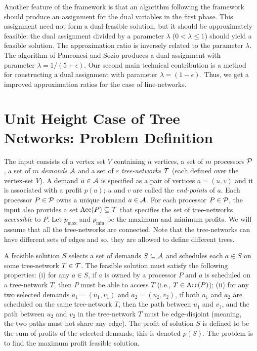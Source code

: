 \documentclass[11pt]{article}
\newcommand{\calP} {{\cal P}}
\newcommand{\calA} {{\cal A}}
\newcommand{\calT} {{\cal T}}
\newcommand{\Acc} {{\rm Acc}}
\begin{document}
Another feature of the framework is that an algorithm following the framework should
produce an assignment for the dual variables in the first phase.
This assignment need not form a dual feasible solution, but it should be approximately feasible:
the dual assignment divided by a parameter $\lambda$ ($0< \lambda \leq 1$) should yield a
feasible solution. The approximation ratio is inversely related to the parameter $\lambda$.
The algorithm of Panconesi and Sozio \cite{Pancj} produces a dual assignment with parameter 
$\lambda=1/(5+\epsilon)$. Our second main technical contribution is a method
for constructing a dual assignment with parameter $\lambda=(1-\epsilon)$.
Thus, we get a improved approximation ratios for the case
of line-networks.

\section{Unit Height Case of Tree Networks: Problem Definition}
The input consists of a vertex set $V$ containing $n$ vertices,
a set of $m$ processors $\calP$, a set of $m$ {\em demands} $\calA$ and
a set of $r$ {\em tree-networks} $\calT$ (each defined over the vertex-set $V$).
A demand $a\in \calA$ is specified as a pair of vertices $a=(u,v)$ 
and it is associated with a profit $p(a)$;
$u$ and $v$ are called the {\em end-points} of $a$.
Each processor $P\in \calP$ owns a unique demand $a\in \calA$.
For each processor $P\in \calP$, the input also provides a set $\Acc(P)\subseteq \calT$
that specifies the set of tree-networks {\em accessible} to $P$.
Let $p_{\max}$ and $p_{\min}$ be the maximum and minimum profits.
We will assume that all the tree-networks are connected. 
Note that the tree-networks can have different sets of edges and so, they are allowed to define different trees.

A feasible solution $S$ selects a set of demands $S\subseteq \calA$
and schedules each $a\in S$ on some tree-network $T\in \calT$.
The feasible solution must satisfy the following properties:
(i) for any $a\in S$, if $a$ is owned by a processor $P$
and $a$ is scheduled on a tree-network $T$, then $P$ must be able to access $T$ (i.e., $T\in \Acc(P)$);
(ii) for any two selected demands $a_1=(u_1, v_1)$ and $a_2=(u_2, v_2)$,
if both $a_1$ and $a_2$ are scheduled on the same tree-network $T$,
then the path between $u_1$ and $v_1$, and the path between $u_2$ and $v_2$ in the
tree-network $T$ must be edge-disjoint (meaning, the two paths must not share any edge).
The profit of solution $S$ is defined to be the sum of profits of the selected demands;
this is denoted $p(S)$. The problem is to find the maximum profit feasible solution.
\end{document}
